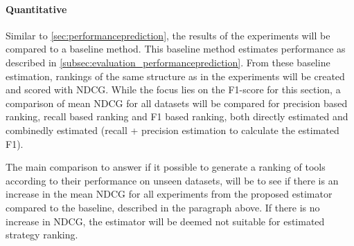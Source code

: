 \paragraph{Quantitative} Similar to \autoref{sec:performanceprediction}, the results of the experiments will be compared to a baseline method. This baseline method estimates performance as described in \autoref{subsec:evaluation_performanceprediction}. From these baseline estimation, rankings of the same structure as in the experiments will be created and scored with NDCG. While the focus lies on the F1-score for this section, a comparison of mean NDCG for all datasets will be compared for precision based ranking, recall based ranking and F1 based ranking, both directly estimated and combinedly estimated (recall + precision estimation to calculate the estimated F1).

The main comparison to answer if it possible to generate a ranking of tools according to their performance on unseen datasets, will be to see if there is an increase in the mean NDCG for all experiments from the proposed estimator compared to the baseline, described in the paragraph above. If there is no increase in NDCG, the estimator will be deemed not suitable for estimated strategy ranking. 